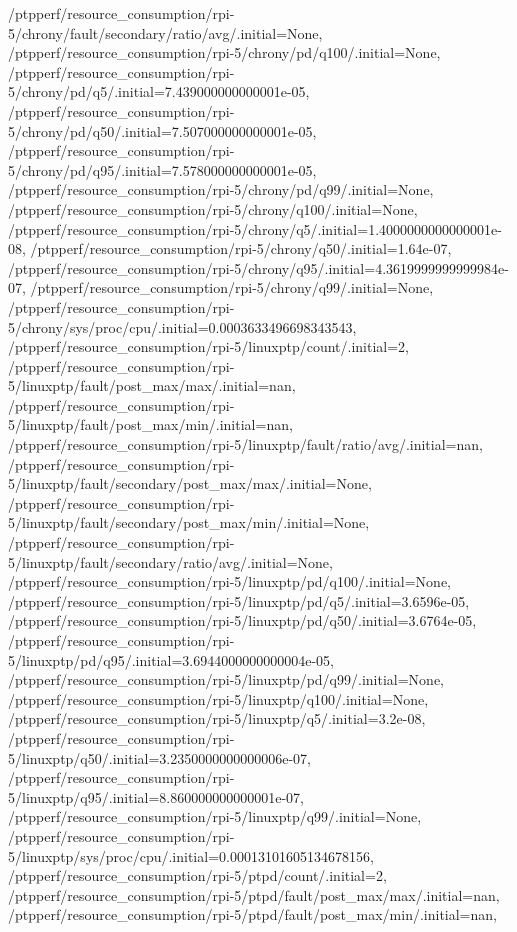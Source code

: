 {    /ptpperf/resource_consumption/rpi-5/chrony/fault/secondary/ratio/avg/.initial=None,
    /ptpperf/resource_consumption/rpi-5/chrony/pd/q100/.initial=None,
    /ptpperf/resource_consumption/rpi-5/chrony/pd/q5/.initial=7.439000000000001e-05,
    /ptpperf/resource_consumption/rpi-5/chrony/pd/q50/.initial=7.507000000000001e-05,
    /ptpperf/resource_consumption/rpi-5/chrony/pd/q95/.initial=7.578000000000001e-05,
    /ptpperf/resource_consumption/rpi-5/chrony/pd/q99/.initial=None,
    /ptpperf/resource_consumption/rpi-5/chrony/q100/.initial=None,
    /ptpperf/resource_consumption/rpi-5/chrony/q5/.initial=1.4000000000000001e-08,
    /ptpperf/resource_consumption/rpi-5/chrony/q50/.initial=1.64e-07,
    /ptpperf/resource_consumption/rpi-5/chrony/q95/.initial=4.3619999999999984e-07,
    /ptpperf/resource_consumption/rpi-5/chrony/q99/.initial=None,
    /ptpperf/resource_consumption/rpi-5/chrony/sys/proc/cpu/.initial=0.0003633496698343543,
    /ptpperf/resource_consumption/rpi-5/linuxptp/count/.initial=2,
    /ptpperf/resource_consumption/rpi-5/linuxptp/fault/post_max/max/.initial=nan,
    /ptpperf/resource_consumption/rpi-5/linuxptp/fault/post_max/min/.initial=nan,
    /ptpperf/resource_consumption/rpi-5/linuxptp/fault/ratio/avg/.initial=nan,
    /ptpperf/resource_consumption/rpi-5/linuxptp/fault/secondary/post_max/max/.initial=None,
    /ptpperf/resource_consumption/rpi-5/linuxptp/fault/secondary/post_max/min/.initial=None,
    /ptpperf/resource_consumption/rpi-5/linuxptp/fault/secondary/ratio/avg/.initial=None,
    /ptpperf/resource_consumption/rpi-5/linuxptp/pd/q100/.initial=None,
    /ptpperf/resource_consumption/rpi-5/linuxptp/pd/q5/.initial=3.6596e-05,
    /ptpperf/resource_consumption/rpi-5/linuxptp/pd/q50/.initial=3.6764e-05,
    /ptpperf/resource_consumption/rpi-5/linuxptp/pd/q95/.initial=3.6944000000000004e-05,
    /ptpperf/resource_consumption/rpi-5/linuxptp/pd/q99/.initial=None,
    /ptpperf/resource_consumption/rpi-5/linuxptp/q100/.initial=None,
    /ptpperf/resource_consumption/rpi-5/linuxptp/q5/.initial=3.2e-08,
    /ptpperf/resource_consumption/rpi-5/linuxptp/q50/.initial=3.2350000000000006e-07,
    /ptpperf/resource_consumption/rpi-5/linuxptp/q95/.initial=8.860000000000001e-07,
    /ptpperf/resource_consumption/rpi-5/linuxptp/q99/.initial=None,
    /ptpperf/resource_consumption/rpi-5/linuxptp/sys/proc/cpu/.initial=0.00013101605134678156,
    /ptpperf/resource_consumption/rpi-5/ptpd/count/.initial=2,
    /ptpperf/resource_consumption/rpi-5/ptpd/fault/post_max/max/.initial=nan,
    /ptpperf/resource_consumption/rpi-5/ptpd/fault/post_max/min/.initial=nan,
}
